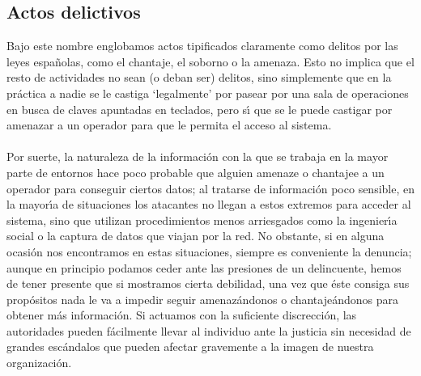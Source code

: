 \subsection{Actos delictivos}
Bajo este nombre englobamos actos tipificados claramente como delitos por las
leyes espa\~nolas, como el chantaje, el soborno o la amenaza. Esto no implica
que el resto de actividades no sean (o deban ser) delitos, sino simplemente que
en la pr\'actica a nadie se le castiga `legalmente' por pasear por una sala
de operaciones en busca de claves apuntadas en teclados, pero s\'{\i} que se
le puede castigar por amenazar a un operador para que le permita el acceso al
sistema.\\
\\Por suerte, la naturaleza de la informaci\'on con la que se trabaja en la
mayor parte de
entornos hace poco probable que alguien amenaze o chantajee a un operador
para conseguir ciertos datos; al tratarse de informaci\'on poco sensible, 
en la mayor\'{\i}a de situaciones los atacantes no llegan a estos extremos para
acceder al sistema, sino que utilizan procedimientos menos arriesgados como la
ingenier\'{\i}a social o la captura de datos que viajan por la red. No obstante,
si en alguna ocasi\'on nos encontramos en estas situaciones, siempre es 
conveniente la denuncia; aunque en principio podamos ceder ante las presiones 
de un delincuente, hemos de tener presente que si mostramos cierta debilidad, 
una vez que \'este consiga sus prop\'ositos nada le va a impedir seguir 
amenaz\'andonos o chantaje\'andonos para obtener m\'as informaci\'on. Si 
actuamos con la suficiente discrecci\'on, las autoridades pueden f\'acilmente
llevar al individuo ante la justicia sin necesidad de grandes esc\'andalos que
pueden afectar gravemente a la imagen de nuestra organizaci\'on.
